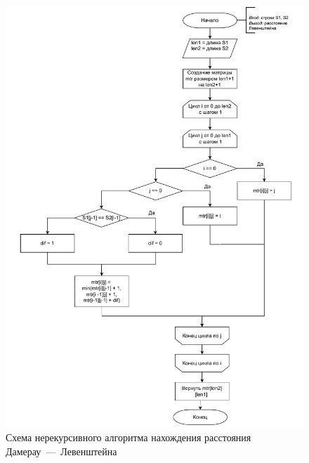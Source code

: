 \begin{figure}[h]
	\centering
	\includegraphics[height=0.9\textheight, page=2]{img/algorithms.pdf}
	\caption{Схема нерекурсивного алгоритма нахождения расстояния Дамерау~---~Левенштейна}
	\label{fig:DLiter}
\end{figure}

\clearpage

